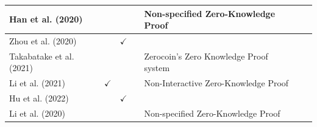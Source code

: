 \documentclass[../access.tex]{subfiles}
\begin{document}
\begin{table}[htbp]
\begin{adjustwidth}{-2cm}{}
\begin{tabular}{m{4.4cm} c >{\centering\arraybackslash}m{1.7cm} c >{\centering\arraybackslash}m{6cm} >{\centering\arraybackslash} m{1.0cm} >{\centering\arraybackslash}m{14.9cm}}
            \hline
            \footnotesize{Han et al. (2020) \cite{Han2020}}                & {}                                                   & {}                                   & {}                      & \footnotesize{Non-specified Zero-Knowledge Proof}                                        \\
            \hline
            \footnotesize{Zhou et al. (2020) \cite{Zhou2020}}              & {}                                                   & $ \checkmark $                       & {}                      & {}                                                                                       \\
            \hline
            \footnotesize{Takabatake et al. (2021) \cite{Takabatake2021}}  & {}                                                   & {}                                   & {}                      & \footnotesize{Zerocoin's Zero Knowledge Proof system}                                    \\
            \hline
            \footnotesize{Li et al. (2021) \cite{Li2021}}                  & $ \checkmark $                                       & {}                                   & {}                      & \footnotesize{Non-Interactive Zero-Knowledge Proof}                                      \\
            \hline
            \footnotesize{Hu et al. (2022) \cite{Hu2022}}                  & {}                                                   & $ \checkmark $                       & {}                      & {}                                                                                       \\
            \hline
            \footnotesize{Li et al. (2020) \cite{Li2022}}                  & {}                                                   & {}                                   & {}                      & \footnotesize{Non-specified Zero-Knowledge Proof}                                        \\
            \bottomrule
        \end{tabular}
    \end{adjustwidth}
    \label{tbl:table5}
\end{table}
\end{document}
